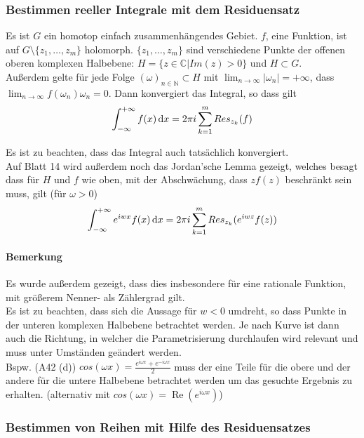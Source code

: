 \subsubsection{Bestimmen reeller Integrale mit dem Residuensatz}
Es ist $G$ ein homotop einfach zusammenhängendes Gebiet. $f$, eine Funktion, ist auf $G\setminus\{z_1,\dots,z_m\}$ holomorph. $\{z_1,\dots,z_m\}$ sind verschiedene Punkte der offenen oberen komplexen Halbebene: $H = \{z\in \mathbb{C} | Im(z) > 0\}$ und $H \subset G$.\\
Außerdem gelte für jede Folge $(\omega)_{n \in \mathbb{N}} \subset H$ mit $\lim_{n \to \infty}|\omega_n|=+\infty$, dass $\lim_{n \to \infty}f(\omega_n)\omega_n=0$. Dann konvergiert das Integral, so dass gilt
\begin{equation*}
    \int_{-\infty}^{+\infty}f(x)\mathop{}\!\mathrm{d} x = 2\pi i \sum_{k=1}^m Res_{z_k}(f)
\end{equation*}

Es ist zu beachten, dass das Integral auch tatsächlich konvergiert.\\
\noindent Auf Blatt 14 wird außerdem noch das Jordan'sche Lemma gezeigt, welches besagt dass für $H$ und $f$ wie oben, mit der Abschwächung, dass $zf(z)$ beschränkt sein muss, gilt (für $\omega>0$)
\begin{equation*}
    \int_{-\infty}^{+\infty} e^{iwx}f(x)\mathop{}\!\mathrm{d} x = 2\pi i\sum_{k=1}^m Res_{z_k}(e^{iwz}f(z))
\end{equation*}

\paragraph{Bemerkung}
Es wurde außerdem gezeigt, dass dies insbesondere für eine rationale Funktion, mit größerem Nenner- als Zählergrad gilt.\\
\noindent Es ist zu beachten, dass sich die Aussage für $w<0$ umdreht, so dass Punkte in der unteren komplexen Halbebene betrachtet werden. Je nach Kurve ist dann auch die Richtung, in welcher die Parametrisierung durchlaufen wird relevant und muss unter Umständen geändert werden.\\
Bspw. (A42 (d)) $cos(\omega x) = \frac{e^{i\omega x} + e^{-i\omega x}}{2}$ muss der eine Teile für die obere und der andere für die untere Halbebene betrachtet werden um das gesuchte Ergebnis zu erhalten. (alternativ mit $cos(\omega x) = \operatorname{Re}(e^{i\omega x})$)

\subsubsection{Bestimmen von Reihen mit Hilfe des Residuensatzes}

